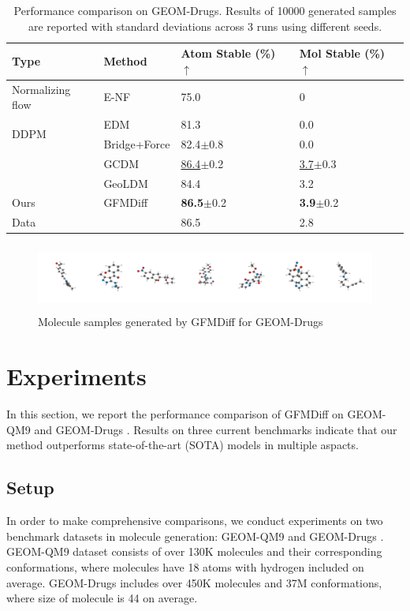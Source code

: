 \documentclass[letterpaper]{article}
\begin{document}
\begin{table}[t]
\centering
\begin{tabular}{llll}
\hline
Type & Method & Atom Stable (\%) $\uparrow$ & Mol Stable (\%) $\uparrow$ \\
\hline
Normalizing flow & E-NF & 75.0 & 0 \\
\multirow{2}{*}{DDPM}
& EDM  & 81.3 & 0.0 \\
& Bridge+Force & 82.4$\pm$0.8 & 0.0 \\
& GCDM & \underline{86.4}$\pm$0.2 & \underline{3.7}$\pm$0.3 \\
& GeoLDM & 84.4 & 3.2 \\
\hline
Ours & GFMDiff & \textbf{86.5}$\pm$0.2 & \textbf{3.9}$\pm$0.2 \\
\hline
Data &  & 86.5 & 2.8 \\
\hline
\end{tabular}
\caption{Performance comparison on GEOM-Drugs. Results of 10000 generated samples are reported with standard deviations across 3 runs using different seeds.}
\label{tab:exp_drugs}
\end{table}
\begin{figure}[t]
\centering
\includegraphics[width=\linewidth,height=0.87in ]{samples_drugs.png}
\caption{Molecule samples generated by GFMDiff for GEOM-Drugs}
\label{fig:samples_drugs}
\end{figure}

\section{Experiments}
In this section, we report the performance comparison of GFMDiff on GEOM-QM9 \cite{qm9_14_ramakrishnan} and GEOM-Drugs \cite{drugs_22_axelrod}.
Results on three current benchmarks indicate that our method  outperforms state-of-the-art (SOTA) models in multiple aspacts.

\subsection{Setup}
In order to make comprehensive comparisons, we conduct experiments on two benchmark datasets in molecule generation: GEOM-QM9 \cite{qm9_14_ramakrishnan} and GEOM-Drugs \cite{drugs_22_axelrod}. GEOM-QM9 dataset consists of over 130K molecules and their corresponding conformations, where molecules have 18 atoms with hydrogen included on average. GEOM-Drugs includes over 450K molecules and 37M conformations, where size of molecule is 44 on average.
\end{document}
